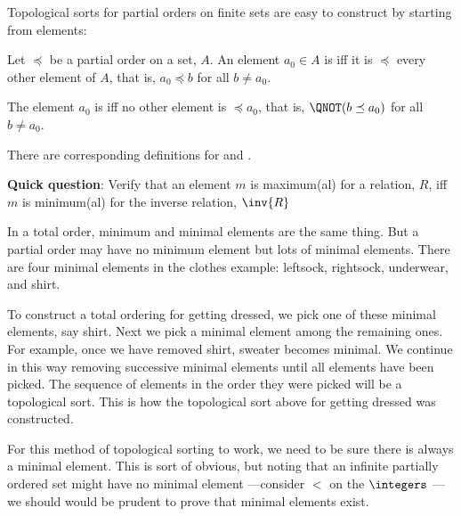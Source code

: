 Topological sorts for partial orders on finite sets are easy to construct
by starting from  elements:

\begin{definition}
  Let $\preceq$ be a partial order on a set, $A$.  An element $a_0 \in A$
  is  iff it is $\preceq$ every
  other element of $A$, that is, $a_0 \preceq b$ for all $b \neq a_0$.

  The element $a_0$ is  iff no
  other element is $\preceq a_0$, that is, $\QNOT(b \preceq a_0)$ for all
  $b \neq a_0$.
\end{definition}

There are corresponding definitions for  and .

\textbf{Quick question}: Verify that an element $m$ is maximum(al) for a
relation, $R$, iff $m$ is minimum(al) for the inverse relation, $\inv{R}$

In a total order, minimum and minimal elements are the same thing.  But a
partial order may have no minimum element but lots of minimal elements.
There are four minimal elements in the clothes example: leftsock,
rightsock, underwear, and shirt.

To construct a total ordering for getting dressed, we pick one of these
minimal elements, say shirt.  Next we pick a minimal element among the
remaining ones.  For example, once we have removed shirt, sweater becomes
minimal.  We continue in this way removing successive minimal elements
until all elements have been picked.  The sequence of elements in the
order they were picked will be a topological sort.  This is how the
topological sort above for getting dressed was constructed.

\iffalse %

For this method of topological sorting to work, we need to be sure there
is always a minimal element.  This is sort of obvious, but noting that an
infinite partially ordered set might have no minimal element ---consider
$<$ on the $\integers$ ---we should  would be prudent to prove that minimal
elements exist.

